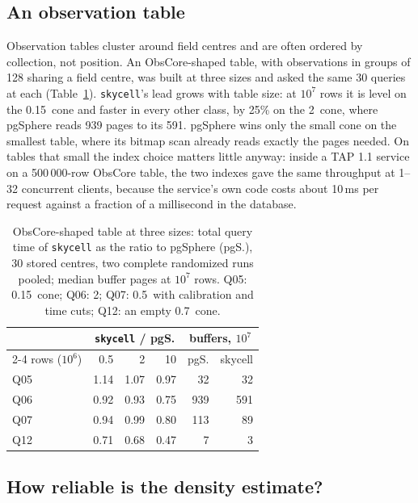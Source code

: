 \subsection{An observation table}
\label{sec:tap}

Observation tables cluster around field centres and are often ordered by collection,
not position. An ObsCore-shaped table, with observations in groups of 128 sharing a field centre, was
built at three sizes and asked the same 30 queries at each (Table~\ref{tab:crossover}).
\texttt{skycell}'s lead grows with table size: at $10^7$ rows it is level on the
0.15\degr\ cone and faster in every other class, by 25\% on the 2\degr\ cone, where
pgSphere reads 939 pages to its 591. pgSphere wins only the small cone on the smallest
table, where its bitmap scan already reads exactly the pages needed. On tables that
small the index choice matters little anyway: inside a TAP 1.1 service \citep{egernia} on
a 500\,000-row ObsCore table, the two indexes gave the same throughput at 1--32
concurrent clients, because the service's own code costs about 10\,ms per request
against a fraction of a millisecond in the database.

\begin{table}
  \caption{ObsCore-shaped table at three sizes: total query time of \texttt{skycell} as
    the ratio to pgSphere (pgS.), 30 stored centres, two complete randomized runs
    pooled; median buffer pages at $10^7$ rows. Q05: 0.15\degr\ cone; Q06: 2\degr;
    Q07: 0.5\degr\ with calibration and time cuts; Q12: an empty 0.7\arcsec\ cone.}
  \label{tab:crossover}
  \centering
  \footnotesize
  \setlength{\tabcolsep}{3pt}
  \begin{tabular}{l rrr rr}
    \hline\hline
    & \multicolumn{3}{c}{\texttt{skycell} / pgS.} & \multicolumn{2}{c}{buffers, $10^7$} \\
    \cline{2-4}\cline{5-6}
    rows ($10^6$) & 0.5 & 2 & 10 & pgS. & skycell \\
    \hline
    Q05 & 1.14 & 1.07 & 0.97 &  32 &  32 \\
    Q06 & 0.92 & 0.93 & 0.75 & 939 & 591 \\
    Q07 & 0.94 & 0.99 & 0.80 & 113 &  89 \\
    Q12 & 0.71 & 0.68 & 0.47 &   7 &   3 \\
    \hline
  \end{tabular}
\end{table}

\subsection{How reliable is the density estimate?}
\label{sec:estimator}
\label{sec:ablation}

